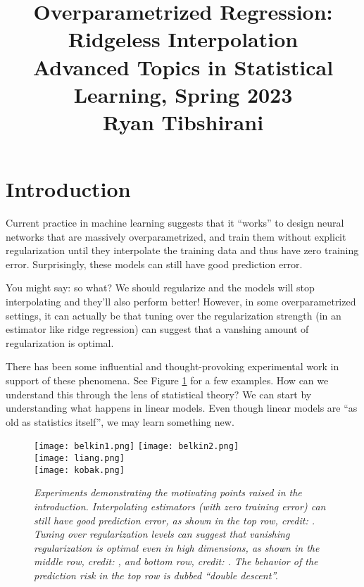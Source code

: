 \documentclass{article}
\title{Overparametrized Regression: Ridgeless Interpolation \\ \smallskip
\large Advanced Topics in Statistical Learning, Spring 2023 \\ \smallskip
Ryan Tibshirani }
\date{}
\begin{document}
\maketitle
\RaggedRight
\vspace{-50pt}

\section{Introduction}

Current practice in machine learning suggests that it ``works'' to design neural
networks that are massively overparametrized, and train them without explicit
regularization until they interpolate the training data and thus have zero
training error. Surprisingly, these models can still have good prediction error.     

You might say: so what? We should regularize and the models will stop
interpolating and they'll also perform better! However, in some overparametrized  
settings, it can actually be that tuning over the regularization strength (in an 
estimator like ridge regression) can suggest that a vanshing amount of
regularization is optimal. 

There has been some influential and thought-provoking experimental work in
support of these phenomena. See Figure \ref{fig:experiments} for a few
examples. How can we understand this through the lens of statistical theory?
We can start by understanding what happens in linear models. Even though linear
models are ``as old as statistics itself'', we may learn something new.    

\begin{figure}[p]
\centering
\hspace{-20pt}
\texttt{[image: belkin1.png]}
\texttt{[image: belkin2.png]} 
\bigskip\medskip \\
\texttt{[image: liang.png]} 
\bigskip \\
\texttt{[image: kobak.png]}
\caption{\it Experiments demonstrating the motivating points raised in the
  introduction. Interpolating estimators (with zero training error) can still   
  have good prediction error, as shown in the top row, credit:
  \citet{belkin2019reconciling}. Tuning over regularization levels can 
  suggest that vanishing regularization is optimal even in high 
  dimensions, as shown in the middle row, credit: \citet{liang2020just}, and
  bottom row, credit: \citet{kobak2020optimal}. The behavior of the prediction
  risk in the top row is dubbed ``double descent''.}   
\label{fig:experiments}
\end{figure}
\end{document}
